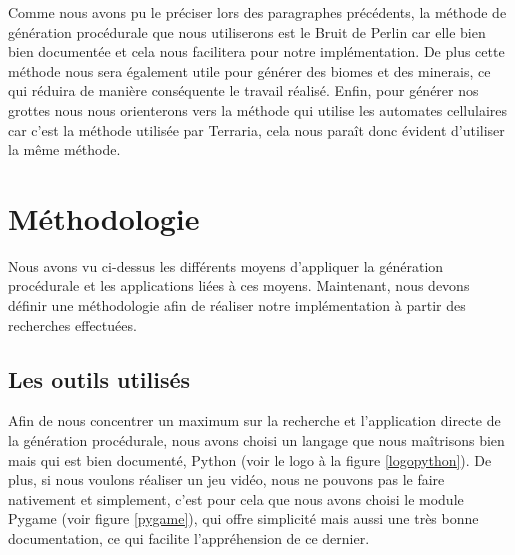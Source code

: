 \documentclass[12pt]{article}
\begin{document}
Comme nous avons pu le préciser lors des paragraphes précédents, la méthode de génération procédurale que nous utiliserons est le Bruit de Perlin car elle bien bien documentée et cela nous facilitera pour notre implémentation. De plus cette méthode nous sera également utile pour générer des biomes et des minerais, ce qui réduira de manière conséquente le travail réalisé. Enfin, pour générer nos grottes nous nous orienterons vers la méthode qui utilise les automates cellulaires car c'est la méthode utilisée par Terraria, cela nous paraît donc évident d'utiliser la même méthode. 
\newpage
\section{Méthodologie}

Nous avons vu ci-dessus les différents moyens d'appliquer la génération procédurale et les applications liées à ces moyens. Maintenant, nous devons définir une méthodologie afin de réaliser notre implémentation à partir des recherches effectuées.

\subsection{Les outils utilisés}

Afin de nous concentrer un maximum sur la recherche et l'application directe de la génération procédurale, nous avons choisi un langage que nous maîtrisons bien mais qui est bien documenté, Python (voir le logo à la figure \ref{logopython}). De plus, si nous voulons réaliser un jeu vidéo, nous ne pouvons pas le faire nativement et simplement, c'est pour cela que nous avons choisi le module Pygame (voir figure \ref{pygame}), qui offre simplicité mais aussi une très bonne documentation, ce qui facilite l’appréhension de ce dernier.\par
\end{document}
